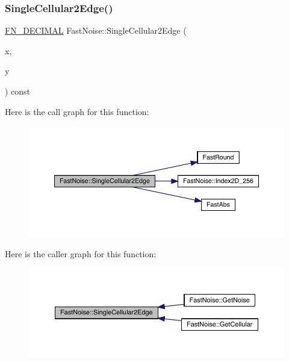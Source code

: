 \subsubsection{\texorpdfstring{Single\+Cellular2\+Edge()}{SingleCellular2Edge()}\hspace{0.1cm}{\footnotesize\ttfamily [1/2]}}
{\footnotesize\ttfamily \mbox{\hyperlink{_fast_noise_8h_a75a9ef6d2541c4921815b885bfd449c3}{F\+N\+\_\+\+D\+E\+C\+I\+M\+AL}} Fast\+Noise\+::\+Single\+Cellular2\+Edge (\begin{DoxyParamCaption}\item[{\mbox{\hyperlink{_fast_noise_8h_a75a9ef6d2541c4921815b885bfd449c3}{F\+N\+\_\+\+D\+E\+C\+I\+M\+AL}}}]{x,  }\item[{\mbox{\hyperlink{_fast_noise_8h_a75a9ef6d2541c4921815b885bfd449c3}{F\+N\+\_\+\+D\+E\+C\+I\+M\+AL}}}]{y }\end{DoxyParamCaption}) const\hspace{0.3cm}{\ttfamily [private]}}

Here is the call graph for this function\+:
\nopagebreak
\begin{figure}[H]
\begin{center}
\leavevmode
\includegraphics[width=350pt]{d1/dd8/class_fast_noise_a2b9280204ddb0ffe0b8c3c6502cfe05e_cgraph}
\end{center}
\end{figure}
Here is the caller graph for this function\+:
\nopagebreak
\begin{figure}[H]
\begin{center}
\leavevmode
\includegraphics[width=350pt]{d1/dd8/class_fast_noise_a2b9280204ddb0ffe0b8c3c6502cfe05e_icgraph}
\end{center}
\end{figure}
\mbox{\label{class_fast_noise_a10e1d5c203e0d93b70f9f3aa4718e221}} 
